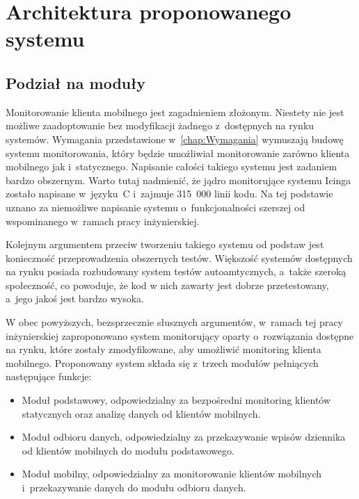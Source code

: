 \chapter{Architektura proponowanego systemu}
\label{chap:ArchCal}

\section[Podział na moduły][Podział na moduły]{Podział na moduły}

Monitorowanie klienta mobilnego jest zagadnieniem złożonym. Niestety
nie jest możliwe zaadoptowanie bez modyfikacji żadnego z~dostępnych na
rynku systemów. Wymagania przedstawione w~\ref{chap:Wymagania}
wymuszają budowę systemu monitorowania, który będzie umożliwiał
monitorowanie zarówno klienta mobilnego jak i~statycznego. Napisanie
całości takiego systemu jest zadaniem bardzo obszernym. Warto tutaj
nadmienić, że jądro monitorujące systemu Icinga zostało napisane
w~języku~C i~zajmuje 315~000 linii kodu. Na tej podstawie uznano za
niemożliwe napisanie systemu o~funkcjonalności szerszej od
wspominanego w~ramach pracy inżynierskiej.

Kolejnym argumentem przeciw tworzeniu takiego systemu od podstaw jest
konieczność przeprowadzenia obszernych testów. Większość systemów
dostępnych na rynku posiada rozbudowany system testów autoamtycznych,
a~także szeroką społeczność, co powoduje, że kod w nich zawarty jest
dobrze przetestowany, a~jego jakoś jest bardzo wysoka.

W obec powyższych, bezsprzecznie słusznych argumentów, w~ramach tej
pracy inżynierskiej zaproponowano system monitorujący oparty
o~rozwiązania dostępne na rynku, które zostały zmodyfikowane, aby
umożliwić monitoring klienta mobilnego. Proponowany system składa się
z~trzech modułów pełniących następujące funkcje:

\begin{itemize}
\item Moduł podstawowy, odpowiedzialny za bezpośredni monitoring
  klientów statycznych oraz analizę danych od klientów mobilnych.
\item Moduł odbioru danych, odpowiedzialny za przekazywanie wpisów
  dziennika od klientów mobilnych do modułu podstawowego.
\item Moduł mobilny, odpowiedzialny za monitorowanie klientów
  mobilnych i~przekazywanie danych do modułu odbioru danych.
\end{itemize}

